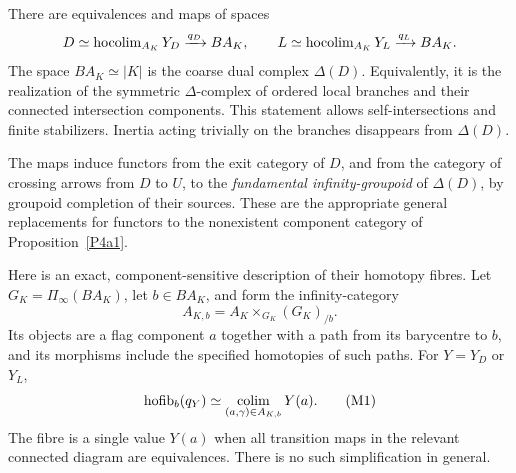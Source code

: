 \begin{theorem}
\label{P4a2}
There are equivalences and maps of spaces
\[
 D\simeq\operatorname{hocolim}_{A_K}Y_D\xrightarrow{q_D}BA_K,
 \qquad
 L\simeq\operatorname{hocolim}_{A_K}Y_L\xrightarrow{q_L}BA_K.
\]
The space $BA_K\simeq|K|$ is the coarse dual complex $\Delta(D)$.  Equivalently, it is the realization of the symmetric $\Delta$-complex of ordered local branches and their connected intersection components.  This statement allows self-intersections and finite stabilizers.  Inertia acting trivially on the branches disappears from $\Delta(D)$.

The maps induce functors from the exit category of $D$, and from the category of crossing arrows from $D$ to $U$, to the \emph{fundamental infinity-groupoid} of $\Delta(D)$, by groupoid completion of their sources.  These are the appropriate general replacements for functors to the nonexistent component category of Proposition~\ref{P4a1}.

Here is an exact, component-sensitive description of their homotopy fibres.  Let $G_K=\Pi_\infty(BA_K)$, let $b\in BA_K$, and form the infinity-category
\[
 A_{K,b}=A_K\mathbin{\times}_{G_K}(G_K)_{/b}.
\]
Its objects are a flag component $a$ together with a path from its barycentre to $b$, and its morphisms include the specified homotopies of such paths.  For $Y=Y_D$ or $Y_L$,
\begin{equation}
 \operatorname{hofib}_b(q_Y)\simeq
 \operatorname*{colim}_{(a,\gamma)\in A_{K,b}}Y(a).
 \tag{M1}
\end{equation}
The fibre is a single value $Y(a)$ when all transition maps in the relevant connected diagram are equivalences.  There is no such simplification in general.
\end{theorem}
